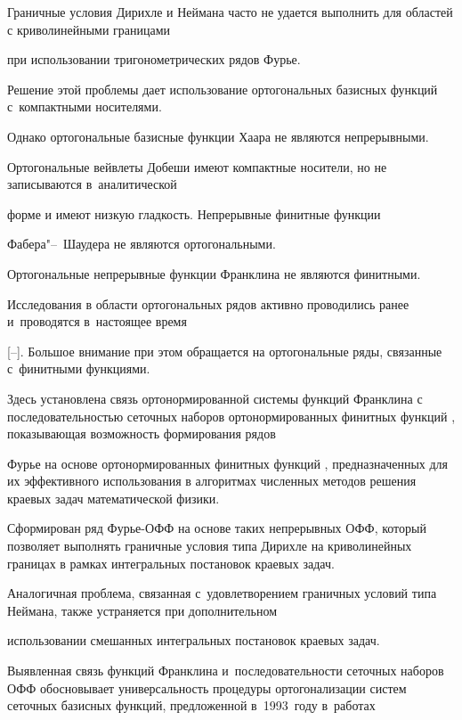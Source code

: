 Граничные условия Дирихле и Неймана часто не удается выполнить для областей с криволинейными границами

при использовании тригонометрических рядов Фурье. 

Решение этой проблемы дает использование ортогональных базисных функций с~компактными носителями. 

Однако ортогональные базисные функции Хаара \cite{leontiev:1} не являются непрерывными. 

Ортогональные вейвлеты Добеши \cite{leontiev:2} имеют компактные носители, но не записываются в~аналитической

форме и имеют низкую гладкость. Непрерывные финитные функции

Фабера"--~Шаудера \cite{leontiev:3, leontiev:4} не являются ортогональными. 

Ортогональные  непрерывные функции Франклина \cite{leontiev:5} не являются финитными.

Исследования в области ортогональных рядов активно проводились ранее и~проводятся в~настоящее время 

[--]. Большое внимание при этом обращается на ортогональные ряды, связанные с~финитными функциями.



Здесь установлена связь ортонормированной системы функций Франклина с последовательностью сеточных наборов ортонормированных финитных функций \cite{leontiev:13}, показывающая возможность формирования рядов

Фурье на основе ортонормированных финитных функций \cite{leontiev:13}, предназначенных для их эффективного использования в алгоритмах численных методов решения краевых задач математической физики.

Сформирован ряд Фурье-ОФФ на основе таких непрерывных ОФФ, который позволяет выполнять граничные условия типа Дирихле на криволинейных границах в рамках интегральных постановок краевых задач. 

Аналогичная проблема, связанная с~удовлетворением граничных условий типа Неймана, также устраняется при дополнительном

использовании смешанных интегральных постановок краевых задач.

Выявленная связь функций Франклина и~последовательности сеточных наборов ОФФ обосновывает универсальность процедуры ортогонализации \cite{leontiev:13} систем сеточных базисных функций, предложенной в~1993~году в~работах 

